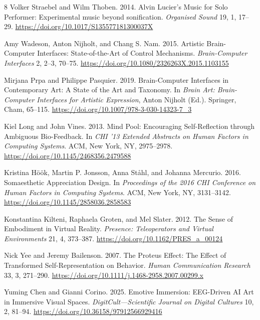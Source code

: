 \documentclass[manuscript,screen,nonacm]{acmart}
\begin{document}
\begin{thebibliography}{8}
 Volker Straebel and Wilm Thoben. 2014. Alvin Lucier's Music for Solo Performer: Experimental music beyond sonification. \emph{Organised Sound} 19, 1, 17--29. \url{https://doi.org/10.1017/S135577181300037X}

 Amy Wadeson, Anton Nijholt, and Chang S. Nam. 2015. Artistic Brain-Computer Interfaces: State-of-the-Art of Control Mechanisms. \emph{Brain-Computer Interfaces} 2, 2--3, 70--75. \url{https://doi.org/10.1080/2326263X.2015.1103155}

 Mirjana Prpa and Philippe Pasquier. 2019. Brain-Computer Interfaces in Contemporary Art: A State of the Art and Taxonomy. In \emph{Brain Art: Brain-Computer Interfaces for Artistic Expression}, Anton Nijholt (Ed.). Springer, Cham, 65--115. \url{https://doi.org/10.1007/978-3-030-14323-7_3}

 Kiel Long and John Vines. 2013. Mind Pool: Encouraging Self-Reflection through Ambiguous Bio-Feedback. In \emph{CHI '13 Extended Abstracts on Human Factors in Computing Systems}. ACM, New York, NY, 2975--2978. \url{https://doi.org/10.1145/2468356.2479588}

 Kristina H\"o\"ok, Martin P. Jonsson, Anna St\aa hl, and Johanna Mercurio. 2016. Somaesthetic Appreciation Design. In \emph{Proceedings of the 2016 CHI Conference on Human Factors in Computing Systems}. ACM, New York, NY, 3131--3142. \url{https://doi.org/10.1145/2858036.2858583}

 Konstantina Kilteni, Raphaela Groten, and Mel Slater. 2012. The Sense of Embodiment in Virtual Reality. \emph{Presence: Teleoperators and Virtual Environments} 21, 4, 373--387. \url{https://doi.org/10.1162/PRES_a_00124}

 Nick Yee and Jeremy Bailenson. 2007. The Proteus Effect: The Effect of Transformed Self-Representation on Behavior. \emph{Human Communication Research} 33, 3, 271--290. \url{https://doi.org/10.1111/j.1468-2958.2007.00299.x}

 Yuming Chen and Gianni Corino. 2025. Emotive Immersion: EEG-Driven AI Art in Immersive Visual Spaces. \emph{DigitCult---Scientific Journal on Digital Cultures} 10, 2, 81--94. \url{https://doi.org/10.36158/97912566929416}

\end{thebibliography}
\end{document}
